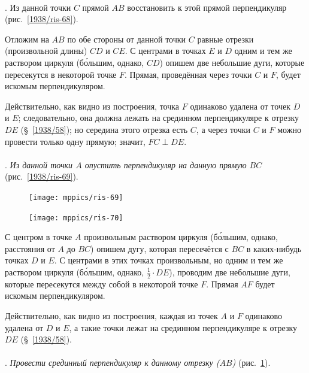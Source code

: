 \documentclass[oneside]{book}
\begin{document}
\paragraph{}\label{1938/65}
.
Из данной точки $C$ прямой $AB$ восстановить к этой прямой перпендикуляр (рис.~\ref{1938/ris-68}).

Отложим на $AB$ по обе стороны от данной точки $C$ равные отрезки (произвольной длины) $CD$ и $CE$.
С центрами в точках $E$ и $D$ одним и тем же раствором циркуля (б\'{о}льшим, однако, $CD$) опишем две небольшие дуги, которые пересекутся в некоторой точке $F$.
Прямая, проведённая через точки $C$ и $F$, будет искомым перпендикуляром.

Действительно, как видно из построения, точка $F$ одинаково удалена от точек $D$ и $E$;
следовательно, она должна лежать на срединном перпендикуляре к отрезку $DE$ (§~\ref{1938/58});
но середина этого отрезка есть $C$, а через точки $C$ и $F$ можно провести только одну прямую;
значит, $FC \perp DE$.

\paragraph{}\label{1938/66}
.
\emph{Из данной точки $A$ опустить перпендикуляр на данную прямую $BC$} (рис.~\ref{1938/ris-69}).

\begin{figure}
\centering
\texttt{[image: mppics/ris-69]}
\caption{}\label{1938/ris-69}
\bigskip
\texttt{[image: mppics/ris-70]}
\caption{}\label{1938/ris-70}
\end{figure}

С центром в точке $A$ произвольным раствором циркуля (б\'{о}льшим, однако, расстояния от $A$ до $BC$) опишем дугу, которая пересечётся с $BC$ в каких-нибудь точках $D$ и $E$.
С центрами в этих точках произвольным, но одним и тем же раствором циркуля (б\'{о}льшим, однако, $\tfrac12\cdot DE$), проводим две небольшие дуги, которые пересекутся между собой в некоторой точке $F$.
Прямая $AF$ будет искомым перпендикуляром.

Действительно, как видно из построения, каждая из точек $A$ и $F$ одинаково удалена от $D$ и $E$, а такие точки лежат на срединном перпендикуляре к отрезку $DE$ (§~\ref{1938/58}).

\paragraph{}\label{1938/67}
\mbox{.}
\emph{Провести срединный перпендикуляр к данному отрезку \emph{($AB$)}} (рис.~\ref{1938/ris-70}).
\end{document}
